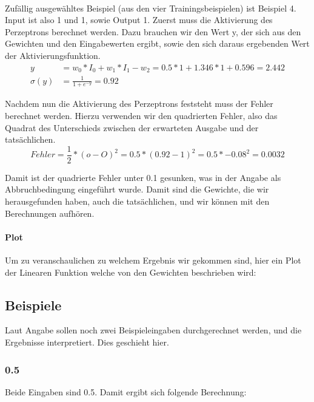 \documentclass[a4paper]{article}
\begin{document}
\paragraph{}
Zufällig ausgewähltes Beispiel (aus den vier Trainingsbeispielen) ist Beispiel 4. Input ist also 1 und 1, sowie Output 1.
Zuerst muss die Aktivierung des Perzeptrons berechnet werden. Dazu brauchen wir den Wert y, der sich aus den Gewichten und den Eingabewerten ergibt, sowie den sich daraus ergebenden Wert der Aktivierungsfunktion.
\begin{align*}
	y &= w_0 * I_0 + w_1 * I_1 - w_2 = 0.5 * 1 + 1.346 * 1 + 0.596 = 2.442 \\
	\sigma(y) &= \frac{1}{1 + e^{-y}} = 0.92
\end{align*}

Nachdem nun die Aktivierung des Perzeptrons feststeht muss der Fehler berechnet werden. Hierzu verwenden wir den quadrierten Fehler, also das Quadrat des Unterschieds zwischen der erwarteten Ausgabe und der tatsächlichen.
\[
	Fehler = \frac{1}{2} * (o - O)^2 = 0.5 * (0.92 - 1)^2 = 0.5 * -0.08^2 = 0.0032
\]

Damit ist der quadrierte Fehler unter 0.1 gesunken, was in der Angabe als Abbruchbedingung eingeführt wurde. Damit sind die Gewichte, die wir herausgefunden haben, auch die tatsächlichen, und wir können mit den Berechnungen aufhören.

\paragraph{Plot}
Um zu veranschaulichen zu welchem Ergebnis wir gekommen sind, hier ein Plot der Linearen Funktion welche von den Gewichten beschrieben wird:


\subsection{Beispiele}
Laut Angabe sollen noch zwei Beispieleingaben durchgerechnet werden, und die Ergebnisse interpretiert. Dies geschieht hier.

\subsubsection{0.5}
Beide Eingaben sind 0.5. Damit ergibt sich folgende Berechnung:
\end{document}
